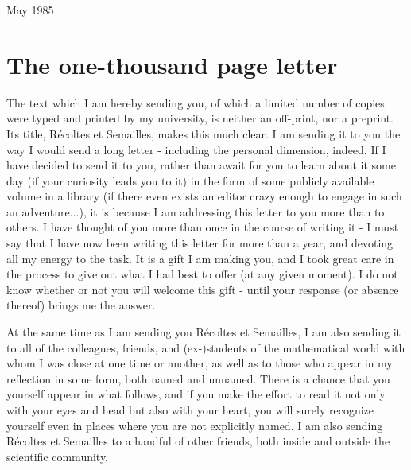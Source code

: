 \begin{comment}
\documentclass{book}
\usepackage{master}
\newcommand{\rec}{$\text{R\'ecoltes et Semailles}$}
\newcommand{\no}{n$^\circ$}
\hfuzz = 100pt

\end{comment}

May 1985

\section{The one-thousand page letter}

The text which I am hereby sending you, of which a limited number of copies were typed and printed by my university, is neither an off-print, nor a preprint. Its title, R\'ecoltes et Semailles, makes this much clear. I am sending it to you the way I would send a long letter - including the personal dimension, indeed. If I have decided to send it to you, rather than await for you to learn about it some day (if your curiosity leads you to it) in the form of some publicly available volume in a library (if there even exists an editor crazy enough to engage in such an adventure...), it is because I am addressing this letter to you more than to others. I have thought of you more than once in the course of writing it - I must say that I have now been writing this letter for more than a year, and devoting all my energy to the task. It is a gift I am making you, and I took great care in the process to give out what I had best to offer (at any given moment). I do not know whether or not you will welcome this gift - until your response (or absence thereof) brings me the answer. 

At the same time as I am sending you R\'ecoltes et Semailles, I am also sending it to all of the colleagues, friends, and (ex-)students of the mathematical world with whom I was close at one time or another, as well as to those who appear in my reflection in some form, both named and unnamed. There is a chance that you yourself appear in what follows, and if you make the effort to read it not only with your eyes and head but also with your heart, you will surely recognize yourself even in places where you are not explicitly named. I am also sending R\'ecoltes et Semailles to a handful of other friends, both inside and outside the scientific community.

